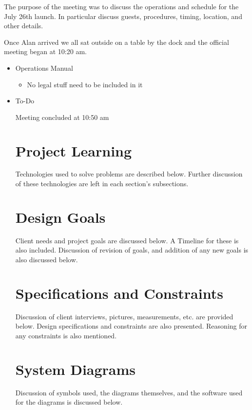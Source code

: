 \documentclass[12pt]{article}
\begin{document}
		\noindent
		The purpose of the meeting was to discuss the operations and schedule for the July 26th launch. In particular discuss guests, procedures, timing, location, and other details.
		
		\noindent
		 Once Alan arrived we all sat outside on a table by the dock and the official meeting began at 10:20 am.
		
		\noindent
		\begin{itemize}
			\item Operations Manual
			\begin{itemize}
				\item No legal stuff need to be included in it
			\end{itemize}
			\item To-Do
		
		\noindent
		Meeting concluded at 10:50 am	
			
		\newpage

	\section{Project Learning}
	Technologies used to solve problems are described below. Further discussion of these technologies are left in each section's subsections.

		\newpage
		
	\section{Design Goals}
	Client needs and project goals are discussed below. A Timeline for these is also included. Discussion of revision of goals, and addition of any new goals is also discussed below.
	
		\newpage	
	
	\section{Specifications and Constraints}
	Discussion of client interviews, pictures, measurements, etc. are provided below. Design specifications and constraints are also presented. Reasoning for any constraints is also mentioned.
	
		\newpage
						
	\section{System Diagrams}
	Discussion of symbols used, the diagrams themselves, and the software used for the diagrams is discussed below.
	

\end{itemize}
\end{document}
